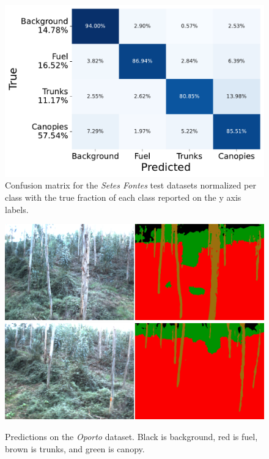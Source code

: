 \begin{figure}
    \centering
    \includegraphics[width=0.7\columnwidth]{figs/results/semantic_segmentation/confusion_matrix.pdf} 
    \caption{Confusion matrix for the \textit{Setes Fontes} test datasets normalized per class with the true fraction of each class reported on the y axis labels.
    }
    \label{fig:semantics_confusion}
\end{figure}
\begin{figure}
   \centering
    \includegraphics[width=\linewidth]{figs/results/semantic_segmentation/SeteFontes/qualatative_001400.png}  
    \includegraphics[width=\linewidth]{figs/results/semantic_segmentation/SeteFontes/qualatative_001600.png}  
    \caption{Predictions on the \textit{Oporto} dataset. Black is background, red is fuel, brown is trunks, and green is canopy.
    } 
    \label{fig:qualitative_semantics_semfire}
\end{figure}

